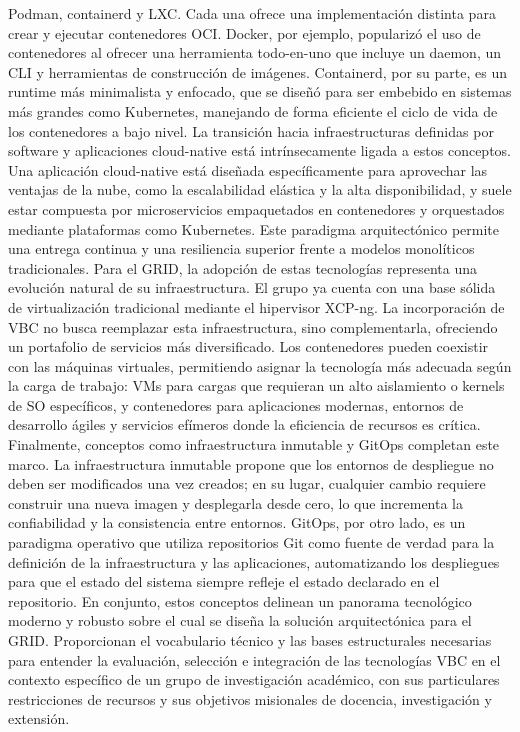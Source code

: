 Podman, containerd y LXC. Cada una ofrece una implementación distinta para crear y ejecutar contenedores OCI. Docker, por ejemplo, popularizó el uso de contenedores al ofrecer una herramienta todo-en-uno que incluye un daemon, un CLI y herramientas de construcción de imágenes. Containerd, por su parte, es un runtime más minimalista y enfocado, que se diseñó para ser embebido en sistemas más grandes como Kubernetes, manejando de forma eficiente el ciclo de vida de los contenedores a bajo nivel. La transición hacia infraestructuras definidas por software y aplicaciones cloud-native está intrínsecamente ligada a estos conceptos. Una aplicación cloud-native está diseñada específicamente para aprovechar las ventajas de la nube, como la escalabilidad elástica y la alta disponibilidad, y suele estar compuesta por microservicios empaquetados en contenedores y orquestados mediante plataformas como Kubernetes. Este paradigma arquitectónico permite una entrega continua y una resiliencia superior frente a modelos monolíticos tradicionales. Para el GRID, la adopción de estas tecnologías representa una evolución natural de su infraestructura. El grupo ya cuenta con una base sólida de virtualización tradicional mediante el hipervisor XCP-ng. La incorporación de VBC no busca reemplazar esta infraestructura, sino complementarla, ofreciendo un portafolio de servicios más diversificado. Los contenedores pueden coexistir con las máquinas virtuales, permitiendo asignar la tecnología más adecuada según la carga de trabajo: VMs para cargas que requieran un alto aislamiento o kernels de SO específicos, y contenedores para aplicaciones modernas, entornos de desarrollo ágiles y servicios efímeros donde la eficiencia de recursos es crítica. Finalmente, conceptos como infraestructura inmutable y GitOps completan este marco. La infraestructura inmutable propone que los entornos de despliegue no deben ser modificados una vez creados; en su lugar, cualquier cambio requiere construir una nueva imagen y desplegarla desde cero, lo que incrementa la confiabilidad y la consistencia entre entornos. GitOps, por otro lado, es un paradigma operativo que utiliza repositorios Git como fuente de verdad para la definición de la infraestructura y las aplicaciones, automatizando los despliegues para que el estado del sistema siempre refleje el estado declarado en el repositorio. En conjunto, estos conceptos delinean un panorama tecnológico moderno y robusto sobre el cual se diseña la solución arquitectónica para el GRID. Proporcionan el vocabulario técnico y las bases estructurales necesarias para entender la evaluación, selección e integración de las tecnologías VBC en el contexto específico de un grupo de investigación académico, con sus particulares restricciones de recursos y sus objetivos misionales de docencia, investigación y extensión.


